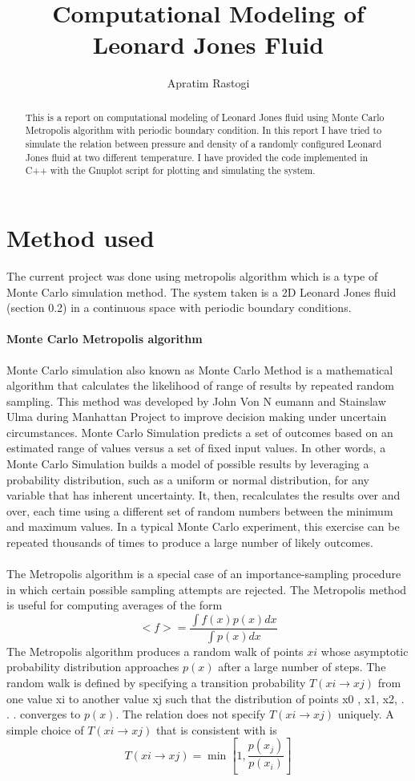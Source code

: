 \documentclass[]{report}
\title{Computational Modeling of Leonard Jones Fluid}
\author{Apratim Rastogi}
\date{}
\begin{document}
\maketitle
{}

\begin{abstract}
	This is a report on computational modeling of Leonard Jones fluid using Monte Carlo Metropolis algorithm with periodic boundary condition. In this report I have tried to simulate the relation between pressure and density of a randomly configured Leonard Jones fluid at two different temperature. I have provided the code implemented in C++ with the Gnuplot script for plotting and simulating the system.  
\end{abstract}
\section*{Method used}
	The current project was done using metropolis algorithm which is a type of Monte Carlo simulation method. The system taken is a 2D Leonard Jones fluid (section 0.2) in a continuous space with periodic boundary conditions.
	
\paragraph*{Monte Carlo Metropolis algorithm}
	Monte Carlo simulation also known as Monte Carlo Method is a mathematical algorithm that calculates the likelihood of range of results by repeated random sampling. This method was developed by John Von N	eumann and Stainslaw Ulma during Manhattan Project to improve decision making under uncertain circumstances. Monte Carlo Simulation predicts a set of outcomes based on an estimated range of values versus a set of fixed input values. In other words, a Monte Carlo Simulation builds a model of possible results by leveraging a probability distribution, such as a uniform or normal distribution, for any variable that has inherent uncertainty. It, then, recalculates the results over and over, each time using a different set of random numbers between the minimum and maximum values. In a typical Monte Carlo experiment, this exercise can be repeated thousands of times to produce a large number of likely outcomes.\paragraph{}
	 The Metropolis algorithm is a special case of an importance-sampling procedure in which certain possible sampling attempts are rejected. The Metropolis method is useful for computing averages of the form \[{<f> =\frac{\int f(x)p(x)dx}{\int p(x)dx}}\] The Metropolis algorithm produces a random walk of	points ${xi}$ whose asymptotic probability distribution approaches $p(x)$ after a large number of steps. The random walk is defined by specifying a transition probability $T (xi \rightarrow xj )$ from one value xi to another value xj such that the distribution of points x0 , x1, x2, . . . converges to $p(x)$. The relation does not specify $T (xi \rightarrow xj )$ uniquely. A simple choice of $T (xi \rightarrow xj )$ that is consistent with is \[  T (xi \rightarrow xj ) = \min[1,\frac{p(x_j)}{p(x_i)}] \]
\end{document}
